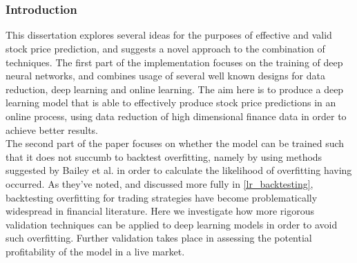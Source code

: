 \documentclass[a4paper,11pt,oneside]{article}
\theoremstyle{plain}
\theoremstyle{definition}
\begin{document}
\part[\large{Online non-linear prediction of financial time-series patterns}]{\Huge\selectfont{Online non-linear prediction of financial time-series patterns}}



\section{Introduction}\label{Introduction}



This dissertation explores several ideas for the purposes of effective and valid stock price prediction, and suggests a novel approach to the combination of techniques. The first part of the implementation focuses on the training of deep neural networks, and combines usage of several well known designs for data reduction, deep learning and online learning. The aim here is to produce a deep learning model that is able to effectively produce stock price predictions in an online process, using data reduction of high dimensional finance data in order to achieve better results. 
~\\\newline
The second part of the paper focuses on whether the model can be trained such that it does not succumb to backtest overfitting, namely by using methods suggested by Bailey et al. \cite{BailyPBO} in order to calculate the likelihood of overfitting having occurred. As they've noted, and discussed more fully in \ref{lr_backtesting}, backtesting overfitting for trading strategies have become problematically widespread in financial literature. Here we investigate how more rigorous validation techniques can be applied to deep learning models in order to avoid such overfitting. Further validation takes place in assessing the potential profitability of the model in a live market.
~\\\newline
\end{document}
